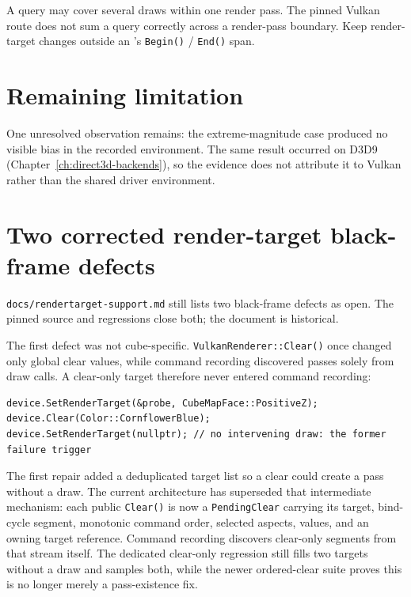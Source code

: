 A query may cover several draws within one render pass. The pinned Vulkan route does not sum a
query correctly across a render-pass boundary. Keep render-target changes outside an
's \texttt{Begin()} / \texttt{End()} span.

\section{Remaining limitation}
\label{sec:vulkan-depthbias}

One unresolved observation remains: the extreme-magnitude
 case produced no visible bias in the recorded environment.
The same result occurred on D3D9 (Chapter~\ref{ch:direct3d-backends}), so the evidence does not
attribute it to Vulkan rather than the shared driver environment.

\section{Two corrected render-target black-frame defects}
\label{sec:vulkan-rendertarget-black}

\begin{historynote}
\texttt{docs/rendertarget-support.md} still lists two black-frame defects as open. The pinned
source and regressions close both; the document is historical.
\end{historynote}

The first defect was not cube-specific. \texttt{VulkanRenderer::Clear()} once changed only
global clear values, while command recording discovered passes solely from draw calls. A
clear-only target therefore never entered command recording:

\begin{lstlisting}
device.SetRenderTarget(&probe, CubeMapFace::PositiveZ);
device.Clear(Color::CornflowerBlue);
device.SetRenderTarget(nullptr); // no intervening draw: the former failure trigger
\end{lstlisting}

The first repair added a deduplicated target list so a clear could create a pass without a
draw. The current architecture has superseded that intermediate mechanism: each public
\texttt{Clear()} is now a \texttt{PendingClear} carrying its target, bind-cycle segment,
monotonic command order, selected aspects, values, and an owning target reference. Command
recording discovers clear-only segments from that stream itself. The dedicated clear-only
 regression still fills two targets without a draw and samples both,
while the newer ordered-clear suite proves this is no longer merely a pass-existence fix.

